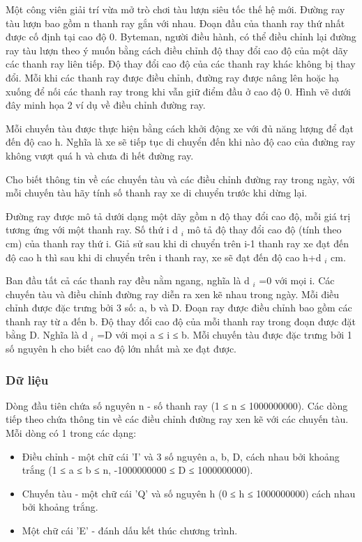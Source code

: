



   Một công viên giải trí vừa mở trò chơi tàu lượn siêu tốc thế hệ mới. Đường ray tàu lượn bao gồm n thanh ray gắn với   nhau. Đoạn đầu của thanh ray thứ nhất được cố định tại cao độ 0. Byteman, người điều hành, có thể điều chỉnh lại đường   ray tàu lượn theo ý muốn bằng cách điều chỉnh       độ thay đổi cao độ      của một dãy các thanh ray liên tiếp. Độ thay   đổi cao độ của các thanh ray khác không bị thay đổi. Mỗi khi các thanh ray được điều chỉnh, đường ray được nâng lên   hoặc hạ xuống để nối các thanh ray trong khi vẫn giữ điểm đầu ở cao độ 0. Hình vẽ dưới đây minh họa 2 ví dụ về điều  chỉnh đường ray.  

   Mỗi chuyến tàu được thực hiện bằng cách khởi động xe với đủ năng lượng để đạt đến độ cao h. Nghĩa là xe sẽ tiếp tục   di chuyển đến khi nào độ cao của đường ray không vượt quá h và chưa đi hết đường ray.  

   Cho biết thông tin về các chuyến tàu và các điều chỉnh đường ray trong ngày, với mỗi chuyến tàu hãy tính số thanh ray   xe di chuyển trước khi dừng lại.  

   Đường ray được mô tả dưới dạng một dãy gồm n độ thay đổi cao độ, mỗi giá trị tương ứng với một thanh ray. Số thứ i   d   $_    i   $   mô tả độ thay đổi cao độ (tính theo cm) của thanh ray thứ i. Giả sử sau khi di chuyển trên i-1 thanh ray xe   đạt đến độ cao h thì sau khi di chuyển trên i thanh ray, xe sẽ đạt đến độ cao h+d   $_    i   $   cm.  

   Ban đầu tất cả các thanh ray đều nằm ngang, nghĩa là d   $_    i   $   =0 với mọi i. Các chuyến tàu và điều chỉnh đường   ray diễn ra xen kẽ nhau trong ngày. Mỗi điều chỉnh được đặc trưng bởi 3 số: a, b và D. Đoạn ray được điều chỉnh bao gồm   các thanh ray từ a đến b. Độ thay đổi cao độ của mỗi thanh ray trong đoạn được đặt bằng D. Nghĩa là d   $_    i   $   =D   với mọi a ≤ i ≤ b. Mỗi chuyến tàu được đặc trưng bởi 1 số nguyên h cho biết cao độ lớn nhất mà xe đạt được.  

\subsubsection{   Dữ liệu  }

   Dòng đầu tiên chứa số nguyên n - số thanh ray (1 ≤ n ≤ 1000000000). Các dòng tiếp theo chứa thông tin về các điều   chỉnh đường ray xen kẽ với các chuyến tàu. Mỗi dòng có 1 trong các dạng:  
\begin{itemize}
	\item     Điều chỉnh - một chữ cái 'I' và 3 số nguyên a, b, D, cách nhau bởi khoảng trắng (1 ≤ a ≤ b ≤ n, -1000000000 ≤ D ≤   1000000000).   
	\item     Chuyến tàu - một chữ cái 'Q' và số nguyên h (0 ≤  h ≤ 1000000000) cách nhau bởi khoảng trắng.   
	\item     Một chữ cái 'E' - đánh dấu kết thúc chương trình.   
\end{itemize}

